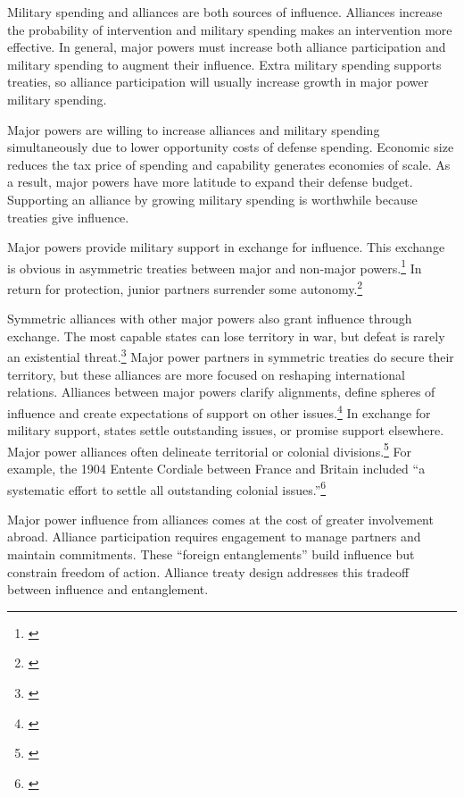 \documentclass[12pt]{article}
\begin{document}
Military spending and alliances are both sources of influence. 
Alliances increase the probability of intervention and military spending makes an intervention more effective. 
In general, major powers must increase both alliance participation and military spending to augment their influence.
Extra military spending supports treaties, so alliance participation will usually increase growth in major power military spending. 


Major powers are willing to increase alliances and military spending simultaneously due to lower opportunity costs of defense spending. 
Economic size reduces the tax price of spending and capability generates economies of scale. 
As a result, major powers have more latitude to expand their defense budget.  
Supporting an alliance by growing military spending is worthwhile because treaties give influence. 


Major powers provide military support in exchange for influence. 
This exchange is obvious in asymmetric treaties between major and non-major powers.\footnote{\cite{Morrow1991}}
In return for protection, junior partners surrender some autonomy.\footnote{\cite{Lake2009}}


Symmetric alliances with other major powers also grant influence through exchange.
The most capable states can lose territory in war, but defeat is rarely an existential threat.\footnote{\cite{Fazal2011}} 
Major power partners in symmetric treaties do secure their territory, but these alliances are more focused on reshaping international relations. 
Alliances between major powers clarify alignments, define spheres of influence and create expectations of support on other issues.\footnote{\cite{Snyder1997}} 
In exchange for military support, states settle outstanding issues, or promise support elsewhere. 
Major power alliances often delineate territorial or colonial divisions.\footnote{\cite{Langer1950, Kissinger1994}}
For example, the 1904 Entente Cordiale between France and Britain included ``a systematic effort to settle all outstanding colonial issues.''\footnote{\citet[pg. 189]{Kissinger1994}}


Major power influence from alliances comes at the cost of greater involvement abroad.
Alliance participation requires engagement to manage partners and maintain commitments.
These ``foreign entanglements'' build influence but constrain freedom of action.
Alliance treaty design addresses this tradeoff between influence and entanglement. 
\end{document}

